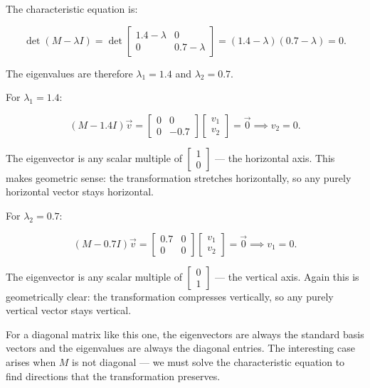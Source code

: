 \documentclass[11pt,openany]{book}
\theoremstyle{definition}
\begin{document}
The characteristic equation is:

\[
\det(M - \lambda I)
= \det\begin{bmatrix} 1.4 - \lambda & 0 \\ 0 & 0.7 - \lambda \end{bmatrix}
= (1.4 - \lambda)(0.7 - \lambda) = 0.
\]

The eigenvalues are therefore $\lambda_1 = 1.4$ and $\lambda_2 = 0.7$.

\medskip

For $\lambda_1 = 1.4$:

\[
(M - 1.4I)\vec{v} =
\begin{bmatrix} 0 & 0 \\ 0 & -0.7 \end{bmatrix}
\begin{bmatrix} v_1 \\ v_2 \end{bmatrix} = \vec{0}
\implies v_2 = 0.
\]

The eigenvector is any scalar multiple of $\begin{bmatrix} 1 \\ 0 \end{bmatrix}$
--- the horizontal axis. This makes geometric sense: the transformation stretches
horizontally, so any purely horizontal vector stays horizontal.

\medskip

For $\lambda_2 = 0.7$:

\[
(M - 0.7I)\vec{v} =
\begin{bmatrix} 0.7 & 0 \\ 0 & 0 \end{bmatrix}
\begin{bmatrix} v_1 \\ v_2 \end{bmatrix} = \vec{0}
\implies v_1 = 0.
\]

The eigenvector is any scalar multiple of $\begin{bmatrix} 0 \\ 1 \end{bmatrix}$
--- the vertical axis. Again this is geometrically clear: the transformation
compresses vertically, so any purely vertical vector stays vertical.

\medskip

For a diagonal matrix like this one, the eigenvectors are always the standard basis
vectors and the eigenvalues are always the diagonal entries. The interesting case
arises when $M$ is not diagonal --- we must solve the characteristic equation to
find directions that the transformation preserves.
\end{document}
